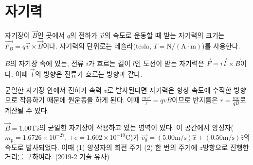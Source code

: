 \section{자기력}
\begin{theorem}[로렌츠 힘]
자기장이 $\vec{B}$인 곳에서 $q$의 전하가 $\vec{v}$의 속도로 운동할 때 받는 자기력의 크기는 $\vec{F_B}=q\vec{v}\times \vec{B}$이다.
자기력의 단위로는 테슬라(tesla, $T=\mathrm{N/(A\cdot m)}$)를 사용한다.
\end{theorem}
\begin{theorem}
$\vec{B}$의 자기장 속에 있는, 전류 $i$가 흐르는 길이 $l$인 도선이 받는 자기력은
$\vec{F}=i\vec{l}\times \vec{B}$이다. 이때 $\vec{l}$의 방향은 전류가 흐르는 방향과 같다.
\end{theorem}
균일한 자기장 안에서 전하가 속력 $v$로 발사된다면 자기력은 항상 속도에 수직한 방향으로 작용하기 때문에 원운동을 하게 된다. 이때 $\frac{mv^2}{r}=qvB$이므로 반지름은 $r=\frac{mv}{qB}$로 계산될 수 있다.

\begin{exercise} 
$\vec{B}=1.00\mathrm{T}\hat{z}$의 균일한 자기장이 작용하고 있는 영역이 있다. 이 공간에서 양성자($m_p=1.6726\times10^{−27}$, $+e=1.602\times 10^{-19}$C)가 $\vec{v_0}=(5.00\mathrm{m/s})\hat{x}+(0.50\mathrm{m/s})\hat{z}$의 속도로 발사되었다. 이때 (1) 양성자의 회전 주기 (2) 한 번의 주기에 $z$방향으로 진행한 거리를 구하여라. (2019-2 기출 유사)
\end{exercise}

